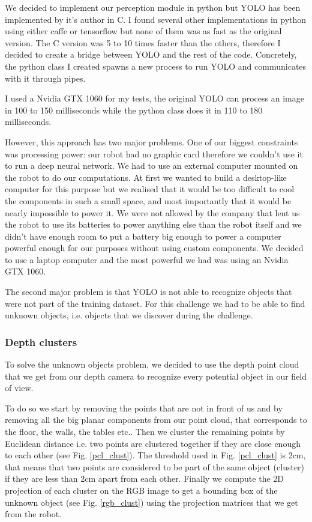 \documentclass[a4paper, twocolumn]{article}
\begin{document}
    We decided to implement our perception module in python but YOLO has been implemented by it's author in C. I found several other implementations in python using either caffe or tensorflow but none of them was as fast as the original version. The C version was 5 to 10 times faster than the others, therefore I decided to create a bridge between YOLO and the rest of the code. Concretely, the python class I created spawns a new process to run YOLO and communicates with it through pipes.

    I used a Nvidia GTX 1060 for my tests, the original YOLO can process an image in 100 to 150 milliseconds while the python class does it in 110 to 180 milliseconds.

    However, this approach has two major problems. One of our biggest constraints was processing power: our robot had no graphic card therefore we couldn't use it to run a deep neural network. We had to use an external computer mounted on the robot to do our computations. At first we wanted to build a desktop-like computer for this purpose but we realised that it would be too difficult to cool the components in such a small space, and most importantly that it would be nearly impossible to power it. We were not allowed by the company that lent us the robot to use its batteries to power anything else than the robot itself and we didn't have enough room to put a battery big enough to power a computer powerful enough for our purposes without using custom components. We decided to use a laptop computer and the most powerful we had was using an Nvidia GTX 1060.

    The second major problem is that YOLO is not able to recognize objects that were not part of the training dataset. For this challenge we had to be able to find unknown objects, i.e. objects that we discover during the challenge.

    \subsubsection{Depth clusters}

    To solve the unknown objects problem, we decided to use the depth point cloud that we get from our depth camera to recognize every potential object in our field of view.

    To do so we start by removing the points that are not in front of us and by removing all the big planar components from our point cloud, that corresponds to the floor, the walls, the tables etc.. Then we cluster the remaining points by Euclidean distance i.e. two points are clustered together if they are close enough to each other (see Fig. \ref{pcl_clust}). The threshold used in Fig. \ref{pcl_clust} is 2cm, that means that two points are considered to be part of the same object (cluster) if they are less than 2cm apart from each other. Finally we compute the 2D projection of each cluster on the RGB image to get a bounding box of the unknown object (see Fig. \ref{rgb_clust}) using the projection matrices that we get from the robot.
\end{document}
